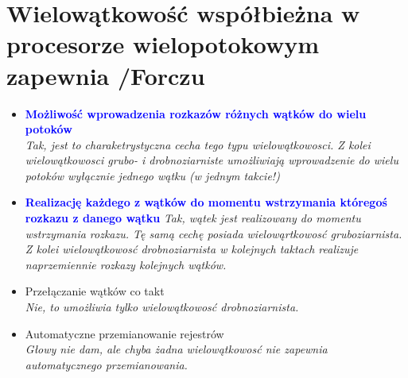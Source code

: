 \section{Wielowątkowość współbieżna w procesorze wielopotokowym zapewnia {\small /Forczu}}
	\begin{itemize}
    \item \textcolor{Blue}{\textbf{Możliwość wprowadzenia rozkazów różnych wątków do wielu potoków}}\\
    {\small \emph{Tak, jest to charaketrystyczna cecha tego typu wielowątkowosci. Z kolei wielowątkowosci grubo- i drobnoziarniste umożliwiają wprowadzenie do wielu potoków \emph{wyłącznie} jednego wątku (w jednym takcie!)}}
    \item \textcolor{Blue}{\textbf{Realizację każdego z wątków do momentu wstrzymania któregoś rozkazu z danego wątku}}
    {\small \emph{Tak, wątek jest realizowany do momentu wstrzymania rozkazu. Tę samą cechę posiada wielowąrtkowosć gruboziarnista. Z kolei wielowątkowosć drobnoziarnista w kolejnych taktach realizuje naprzemiennie rozkazy kolejnych wątków.}}
    \item Przełączanie wątków co takt\\
    {\small \emph{Nie, to umożliwia tylko wielowątkowosć drobnoziarnista.}}
    \item Automatyczne przemianowanie rejestrów\\
    {\small \emph{Głowy nie dam, ale chyba żadna wielowątkowosć nie zapewnia automatycznego przemianowania.}}
    \end{itemize}

